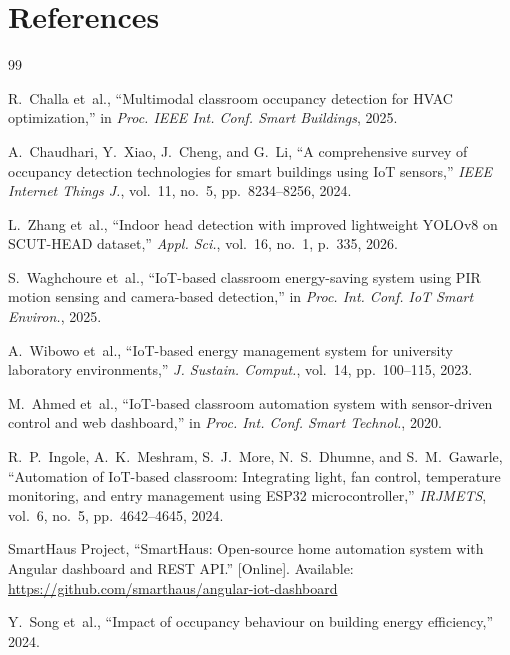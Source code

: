 \chapter*{References}
\label{ch:references}

\begin{thebibliography}{99}

R.~Challa et~al., ``Multimodal classroom occupancy detection for HVAC optimization,'' in \textit{Proc. IEEE Int. Conf. Smart Buildings}, 2025.

A.~Chaudhari, Y.~Xiao, J.~Cheng, and G.~Li, ``A comprehensive survey of occupancy detection technologies for smart buildings using IoT sensors,'' \textit{IEEE Internet Things J.}, vol.~11, no.~5, pp.~8234--8256, 2024.

L.~Zhang et~al., ``Indoor head detection with improved lightweight YOLOv8 on SCUT-HEAD dataset,'' \textit{Appl. Sci.}, vol.~16, no.~1, p.~335, 2026.

S.~Waghchoure et~al., ``IoT-based classroom energy-saving system using PIR motion sensing and camera-based detection,'' in \textit{Proc. Int. Conf. IoT Smart Environ.}, 2025.

A.~Wibowo et~al., ``IoT-based energy management system for university laboratory environments,'' \textit{J. Sustain. Comput.}, vol.~14, pp.~100--115, 2023.

M.~Ahmed et~al., ``IoT-based classroom automation system with sensor-driven control and web dashboard,'' in \textit{Proc. Int. Conf. Smart Technol.}, 2020.

R.~P.~Ingole, A.~K.~Meshram, S.~J.~More, N.~S.~Dhumne, and S.~M.~Gawarle, ``Automation of IoT-based classroom: Integrating light, fan control, temperature monitoring, and entry management using ESP32 microcontroller,'' \textit{IRJMETS}, vol.~6, no.~5, pp.~4642--4645, 2024.

SmartHaus Project, ``SmartHaus: Open-source home automation system with Angular dashboard and REST API.'' [Online]. Available: \url{https://github.com/smarthaus/angular-iot-dashboard}

Y.~Song et~al., ``Impact of occupancy behaviour on building energy efficiency,'' 2024.


\end{thebibliography}
